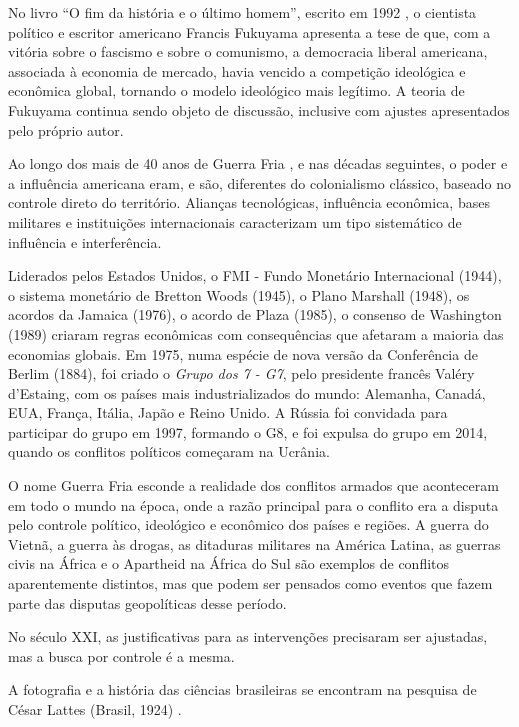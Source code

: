 \documentclass{hipatia}
\begin{document}
No livro ``O fim da história e o último homem'', escrito em 1992 \cite{Fukuyama1992}, o cientista político e escritor americano Francis Fukuyama apresenta a tese de que, com a vitória sobre o fascismo e sobre o comunismo, a democracia liberal americana, associada à economia de mercado, havia vencido a competição ideológica e econômica global, tornando o modelo ideológico mais legítimo. A teoria de Fukuyama continua sendo objeto de discussão, inclusive com ajustes apresentados pelo próprio autor.

Ao longo dos mais de 40 anos de Guerra Fria 	\cite{Hobsbawm1995}, e nas décadas seguintes, o poder e a influência americana eram, e são, diferentes do colonialismo clássico, baseado no controle direto do território. Alianças tecnológicas, influência econômica, bases militares e instituições internacionais caracterizam um tipo sistemático de influência e interferência.

Liderados pelos Estados Unidos, o FMI - Fundo Monetário Internacional (1944), o sistema monetário de Bretton Woods (1945), o Plano Marshall (1948), os acordos da Jamaica (1976), o acordo de Plaza (1985), o consenso de Washington (1989) criaram regras econômicas com consequências que afetaram a maioria das economias globais. Em 1975, numa espécie de nova versão da Conferência de Berlim (1884), foi criado o \textit{Grupo dos 7 - G7}, pelo presidente francês Valéry d’Estaing, com os países mais industrializados do mundo: Alemanha, Canadá, EUA, França, Itália, Japão e Reino Unido. A Rússia foi convidada para participar do grupo em 1997, formando o G8, e foi expulsa do grupo em 2014, quando os conflitos políticos começaram na Ucrânia.

O nome Guerra Fria esconde a realidade dos conflitos armados que aconteceram em todo o mundo na época, onde a razão principal para o conflito era a disputa pelo controle político, ideológico e econômico dos países e regiões. A guerra do Vietnã, a guerra às drogas, as ditaduras militares na América Latina, as guerras civis na África e o Apartheid na África do Sul são exemplos de conflitos aparentemente distintos, mas que podem ser pensados como eventos que fazem parte das disputas geopolíticas desse período.

No século XXI, as justificativas para as intervenções precisaram ser ajustadas, mas a busca por controle é a mesma.

A fotografia e a história das ciências brasileiras se encontram na pesquisa de César Lattes (Brasil, 1924) 	\cite{Vieira2012}.
\end{document}
